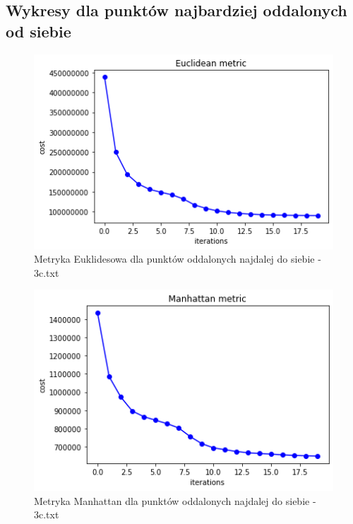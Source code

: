 \documentclass{classrep}
\begin{document}
\subsection{Wykresy dla punktów najbardziej oddalonych od siebie}

\begin{figure}[H]
        \centering
        \includegraphics[width=1\textwidth]{images/images3/AwayEuclidean.png}
        \caption{Metryka Euklidesowa dla punktów oddalonych najdalej do siebie - 3c.txt}
        \label{fig3}
    \end{figure}
\begin{figure}[H]
        \centering
        \includegraphics[width=1\textwidth]{images/images3/AwayManhattan.png}
        \caption{Metryka Manhattan dla punktów oddalonych najdalej do siebie - 3c.txt}
        \label{fig4}
    \end{figure}
\end{document}
